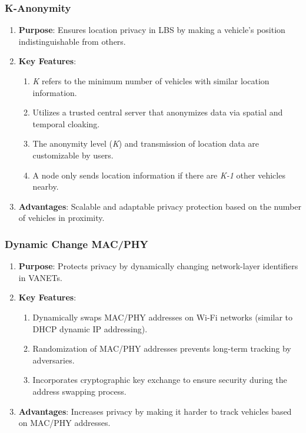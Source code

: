 \subsubsection{K-Anonymity}
\begin{enumerate}
    \item \textbf{Purpose}: Ensures location privacy in LBS by making a vehicle’s position indistinguishable from others.
    \item \textbf{Key Features}:
    \begin{enumerate}
        \item \emph{K} refers to the minimum number of vehicles with similar location information.
        \item Utilizes a trusted central server that anonymizes data via spatial and temporal cloaking.
        \item The anonymity level (\emph{K}) and transmission of location data are customizable by users.
        \item A node only sends location information if there are \emph{K-1} other vehicles nearby.
    \end{enumerate}
    \item \textbf{Advantages}: Scalable and adaptable privacy protection based on the number of vehicles in proximity.
\end{enumerate}

\subsubsection{Dynamic Change MAC/PHY}
\begin{enumerate}
    \item \textbf{Purpose}: Protects privacy by dynamically changing network-layer identifiers in VANETs.
    \item \textbf{Key Features}:
    \begin{enumerate}
        \item Dynamically swaps MAC/PHY addresses on Wi-Fi networks (similar to DHCP dynamic IP addressing).
        \item Randomization of MAC/PHY addresses prevents long-term tracking by adversaries.
        \item Incorporates cryptographic key exchange to ensure security during the address swapping process.
    \end{enumerate}
    \item \textbf{Advantages}: Increases privacy by making it harder to track vehicles based on MAC/PHY addresses.
\end{enumerate}

